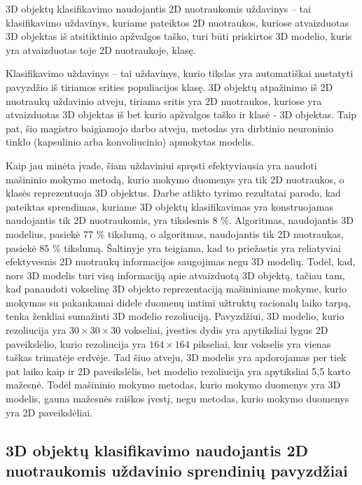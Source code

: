 
3D objektų klasifikavimo naudojantis 2D nuotraukomis uždavinys -- tai klasifikavimo uždavinys, kuriame pateiktos 2D nuotraukos, kuriose atvaizduotas 3D objektas iš atsitiktinio apžvalgos taško, turi būti priskirtos 3D modelio, kuris yra atvaizduotas toje 2D nuotraukoje, klasę.

Klasifikavimo uždavinys -- tai uždavinys, kurio tikslas yra automatiškai nustatyti pavyzdžio iš tiriamos srities populiacijos klasę. 3D objektų atpažinimo iš 2D nuotraukų uždavinio atveju, tiriama sritis yra 2D nuotraukos, kuriose yra atvaizduotas 3D objektas iš bet kurio apžvalgos taško ir klasė - 3D objektas. Taip pat, šio magistro baigiamojo darbo atveju, metodas yra dirbtinio neuroninio tinklo (kapsulinio arba konvoliucinio) apmokytas modelis.

Kaip jau minėta įvade, šiam uždaviniui spręsti efektyviausia yra naudoti mašininio mokymo metodą, kurio mokymo duomenys yra tik 2D nuotraukos, o klasės reprezentuoja 3D objektus. Darbe \cite{dbnExp} atlikto tyrimo rezultatai parodo, kad pateiktas sprendimas, kuriame 3D objektų klasifikavimas yra konstruojamas naudojantis tik 2D nuotraukomis, yra tikslesnis 8 \%. Algoritmas, naudojantis 3D modelius, pasiekė 77 \% tikslumą, o algoritmas, naudojantis tik 2D nuotraukas, pasiekė 85 \% tikslumą. Šaltinyje \cite{cnnExp1} yra teigiama, kad to priežastis yra reliatyviai efektyvesnis 2D nuotraukų informacijos saugojimas negu 3D modelių. Todėl, kad, nors 3D modelis turi visą informaciją apie atvaizduotą 3D objektą, tačiau tam, kad panaudoti vokselinę 3D objekto reprezentaciją mašininiame mokyme, kurio mokymas su pakankamai didele duomenų imtimi užtruktų racionalų laiko tarpą, tenka ženkliai sumažinti 3D modelio rezoliuciją. Pavyzdžiui, 3D modelio, kurio rezoliucija yra $30\times30\times30$ vokseliai, įvesties dydis yra apytiksliai lygus 2D paveikslėlio, kurio rezoliucija yra $164\times164$ pikseliai, kur vokselis yra vienas taškas trimatėje erdvėje. Tad šiuo atveju, 3D modelis yra apdorojamas per tiek pat laiko kaip ir 2D paveikslėlis, bet modelio rezoliucija yra apytiksliai 5,5 karto mažesnė. Todėl mašininio mokymo metodas, kurio mokymo duomenys yra 3D modelis, gauna mažesnės raiškos įvestį, negu metodas, kurio mokymo duomenys yra 2D paveikslėliai.

\subsection{3D objektų klasifikavimo naudojantis 2D nuotraukomis uždavinio sprendinių pavyzdžiai}

